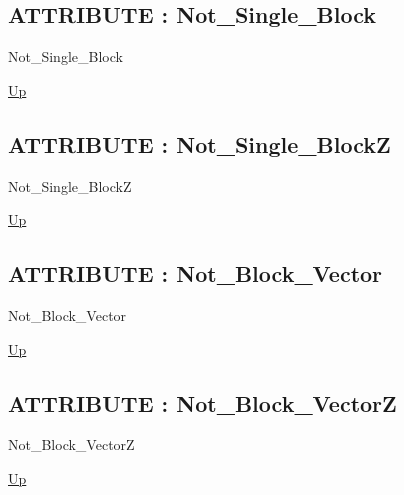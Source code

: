 \par
\par
\subsection*{ATTRIBUTE : Not\_Single\_Block}
\hypertarget{ecldoc:pbblas.constants.not_single_block}{}
\begin{minipage}[t]{\textwidth}
\begin{flushleft}
 Not\_Single\_Block 
\end{flushleft}
\end{minipage}
\hyperlink{ecldoc:PBblas.Constants}{Up}

\par
\par
\subsection*{ATTRIBUTE : Not\_Single\_BlockZ}
\hypertarget{ecldoc:pbblas.constants.not_single_blockz}{}
\begin{minipage}[t]{\textwidth}
\begin{flushleft}
 Not\_Single\_BlockZ 
\end{flushleft}
\end{minipage}
\hyperlink{ecldoc:PBblas.Constants}{Up}

\par
\par
\subsection*{ATTRIBUTE : Not\_Block\_Vector}
\hypertarget{ecldoc:pbblas.constants.not_block_vector}{}
\begin{minipage}[t]{\textwidth}
\begin{flushleft}
 Not\_Block\_Vector 
\end{flushleft}
\end{minipage}
\hyperlink{ecldoc:PBblas.Constants}{Up}

\par
\par
\subsection*{ATTRIBUTE : Not\_Block\_VectorZ}
\hypertarget{ecldoc:pbblas.constants.not_block_vectorz}{}
\begin{minipage}[t]{\textwidth}
\begin{flushleft}
 Not\_Block\_VectorZ 
\end{flushleft}
\end{minipage}
\hyperlink{ecldoc:PBblas.Constants}{Up}

\par
\par

